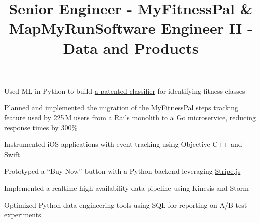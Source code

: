 \documentclass[12pt, tweaklist, line]{res}
\let\tempone\itemize
\let\temptwo\enditemize
\renewenvironment{itemize}{\tempone\vspace{-.15in}\setlength{\topsep}{0pt}\setlength{\itemsep}{3pt}\vspace{-.15in}}{\temptwo}
\begin{document}
\begin{resume}
\pagebreak

\title{Senior Engineer - MyFitnessPal \& MapMyRun}
\begin{position}
\begin{itemize}
\item Used ML in Python to build \href{https://patents.google.com/patent/US20180225367A1/en?oq=20180225367}{a patented classifier} for identifying fitness classes
\item Planned and implemented the migration of the MyFitnessPal steps tracking feature used by 225\,M users from a Rails monolith to a Go microservice, reducing response times by 300\%
\end{itemize}
\end{position}

\title{Software Engineer II - Data and Products}
\begin{position}
\begin{itemize}
\item Instrumented iOS applications with event tracking using Objective-C++ and Swift
\item Prototyped a ``Buy Now'' button with a Python backend leveraging \href{https://stripe.com/}{Stripe.js} %
\item Implemented a realtime high availability data pipeline using Kinesis and Storm
\item Optimized Python data-engineering tools using SQL for reporting on A/B-test experiments %
\end{itemize}
\end{position}


\end{resume}
\end{document}
